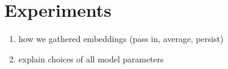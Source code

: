 \section{Experiments}
\label{sec: exp}

\begin{enumerate}
\item how we gathered embeddings (pass in, average, persist)
\item explain choices of all model parameters
\end{enumerate}


